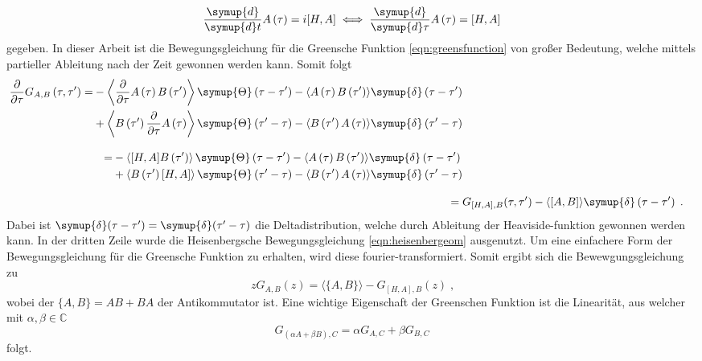 \begin{equation}
\frac{\symup{d}}{\symup{d}t} A \left (\tau \right ) = i  [H, A] \iff \frac{\symup{d}}{\symup{d}\tau} A \left (\tau \right ) = [H, A] \label{eqn:heisenbergeom}
\end{equation}
gegeben.
In dieser Arbeit ist die Bewegungsgleichung für die Greensche Funktion \eqref{eqn:greensfunction} von großer Bedeutung, welche mittels 
partieller Ableitung nach der Zeit gewonnen werden kann.\cite{greensfunction}
Somit folgt
\begin{align*}
    \begin{split}
    \frac{\partial}{\partial \tau} G_{A,B} \left (\tau, \tau' \right) = 
    &- \left \langle \frac{\partial}{\partial \tau}A \left (\tau \right ) B \left ( \tau' \right ) \right \rangle
    \symup{\Theta} \left ( \tau - \tau' \right) -  \langle A \left (\tau \right ) B \left ( \tau' \right ) \rangle \symup{\delta} \left ( \tau - \tau' \right)\\
    &+ \left \langle B \left ( \tau' \right ) \frac{\partial}{\partial \tau}A \left (\tau \right ) \right \rangle \symup{\Theta} \left ( \tau' - \tau \right)
    -  \langle B \left ( \tau' \right ) A \left (\tau \right ) \rangle \symup{\delta} \left ( \tau' - \tau \right)
    \end{split}
    \\[2ex]
    \begin{split}
    = &- \left \langle [H,A] B \left ( \tau' \right ) \right \rangle
    \symup{\Theta} \left ( \tau - \tau' \right) -  \langle A \left (\tau \right ) B \left ( \tau' \right ) \rangle \symup{\delta} \left ( \tau - \tau' \right)\\
    &+ \left \langle B \left ( \tau' \right ) [H,A] \right \rangle \symup{\Theta} \left ( \tau' - \tau \right)
    -  \langle B \left ( \tau' \right ) A \left (\tau \right ) \rangle \symup{\delta} \left ( \tau' - \tau \right)
    \end{split}
    \\[2ex]
    =\; & G_{[H,A],B}(\tau, \tau') - \langle [A,B] \rangle \symup{\delta} \left ( \tau - \tau' \right) \; \text{.}
\end{align*} 
Dabei ist  $\symup{\delta} (\tau-\tau') = \symup{\delta} (\tau'-\tau) $ die Deltadistribution, welche durch Ableitung der Heaviside-funktion gewonnen werden kann.
In der dritten Zeile wurde die Heisenbergsche Bewegungsgleichung \eqref{eqn:heisenbergeom} ausgenutzt.
Um eine einfachere Form der Bewegungsgleichung für die Greensche Funktion zu erhalten, wird diese fourier-transformiert.
Somit ergibt sich die Bewewgungsgleichung zu 
\begin{equation}
    zG_{A,B}(z) = \langle \{A,B\} \rangle - G_{[H,A],B}(z) \; \text{,} \label{eqn:fouriereom}
\end{equation} 
wobei der $\{ A,B \} = AB+BA$ der Antikommutator ist.\cite{greensfunction}
Eine wichtige Eigenschaft der Greenschen Funktion ist die Linearität, aus welcher mit $\alpha, \beta \in \mathbb{C}$
\begin{equation*}
    G_{(\alpha A + \beta B), C} = \alpha G_{A,C} + \beta G_{B,C}
\end{equation*}
folgt.

